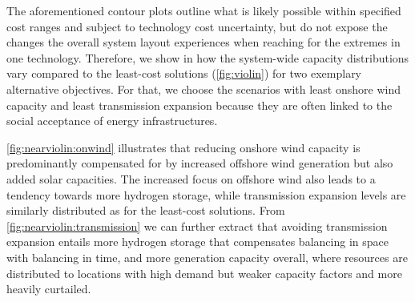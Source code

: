 
The aforementioned contour plots  outline
what is likely possible within specified cost ranges and subject to technology cost uncertainty,
but do not expose
the changes the overall system layout experiences when reaching for the extremes in one technology.
Therefore, we show in  how the system-wide capacity distributions vary
compared to the least-cost solutions (\cref{fig:violin}) for two exemplary alternative objectives.
For that, we choose the scenarios with least onshore wind capacity and least transmission expansion
because they are often linked to the social acceptance of energy infrastructures.

\cref{fig:nearviolin:onwind} illustrates that reducing onshore wind capacity is
predominantly compensated for by increased offshore wind generation but also added solar capacities.
The increased focus on offshore wind also leads to a tendency towards more hydrogen storage,
while transmission expansion levels are similarly distributed as for the least-cost solutions.
From \cref{fig:nearviolin:transmission} we can further extract that avoiding transmission expansion entails
more hydrogen storage that compensates balancing in space with balancing in time,
and more generation capacity overall, where resources are distributed to locations with
high demand but weaker capacity factors and more heavily curtailed.



